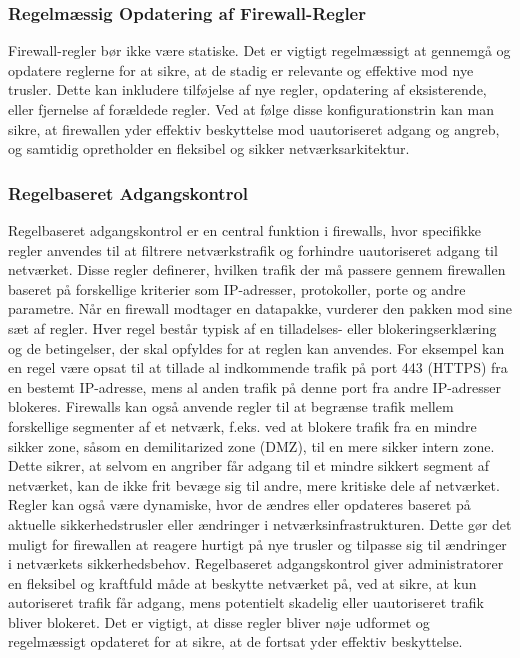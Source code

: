 \subsubsection{Regelmæssig Opdatering af Firewall-Regler}
Firewall-regler bør ikke være statiske. Det er vigtigt regelmæssigt at gennemgå og opdatere reglerne for at sikre, at de stadig er relevante og effektive mod nye trusler. Dette kan inkludere tilføjelse af nye regler, opdatering af eksisterende, eller fjernelse af forældede regler.
\newline\newline\noindent
Ved at følge disse konfigurationstrin kan man sikre, at firewallen yder effektiv beskyttelse mod uautoriseret adgang og angreb, og samtidig opretholder en fleksibel og sikker netværksarkitektur.


\subsubsection{Regelbaseret Adgangskontrol}
Regelbaseret adgangskontrol er en central funktion i firewalls, hvor specifikke regler anvendes til at filtrere netværkstrafik og forhindre uautoriseret adgang til netværket. Disse regler definerer, hvilken trafik der må passere gennem firewallen baseret på forskellige kriterier som IP-adresser, protokoller, porte og andre parametre.
\newline\newline\noindent
Når en firewall modtager en datapakke, vurderer den pakken mod sine sæt af regler. Hver regel består typisk af en tilladelses- eller blokeringserklæring og de betingelser, der skal opfyldes for at reglen kan anvendes. For eksempel kan en regel være opsat til at tillade al indkommende trafik på port 443 (HTTPS) fra en bestemt IP-adresse, mens al anden trafik på denne port fra andre IP-adresser blokeres.
\newline\newline\noindent
Firewalls kan også anvende regler til at begrænse trafik mellem forskellige segmenter af et netværk, f.eks. ved at blokere trafik fra en mindre sikker zone, såsom en demilitarized zone (DMZ), til en mere sikker intern zone. Dette sikrer, at selvom en angriber får adgang til et mindre sikkert segment af netværket, kan de ikke frit bevæge sig til andre, mere kritiske dele af netværket.
\newline\newline\noindent
Regler kan også være dynamiske, hvor de ændres eller opdateres baseret på aktuelle sikkerhedstrusler eller ændringer i netværksinfrastrukturen. Dette gør det muligt for firewallen at reagere hurtigt på nye trusler og tilpasse sig til ændringer i netværkets sikkerhedsbehov.
\newline\newline\noindent
Regelbaseret adgangskontrol giver administratorer en fleksibel og kraftfuld måde at beskytte netværket på, ved at sikre, at kun autoriseret trafik får adgang, mens potentielt skadelig eller uautoriseret trafik bliver blokeret. Det er vigtigt, at disse regler bliver nøje udformet og regelmæssigt opdateret for at sikre, at de fortsat yder effektiv beskyttelse.


